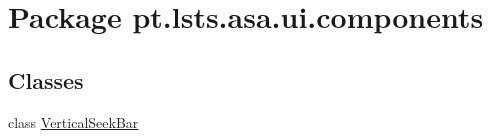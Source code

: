\hypertarget{namespacept_1_1lsts_1_1asa_1_1ui_1_1components}{}\section{Package pt.\+lsts.\+asa.\+ui.\+components}
\label{namespacept_1_1lsts_1_1asa_1_1ui_1_1components}
\subsection*{Classes}
\begin{DoxyCompactItemize}
\item 
class \hyperlink{classpt_1_1lsts_1_1asa_1_1ui_1_1components_1_1VerticalSeekBar}{Vertical\+Seek\+Bar}
\end{DoxyCompactItemize}
